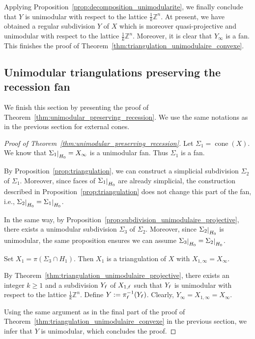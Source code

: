 \documentclass[11pt]{amsart}
\theoremstyle{definition}
\numberwithin{equation}{section}
\newcommand{\ie}{i.e.}
\renewcommand{\~}{\widetilde}
\newcommand{\Z}{\mathbb{Z}}
\newcommand{\rest}[1]{\raisebox{-1pt}{$\vert$}_{#1}}
\newcommand{\f}{{\textnormal{\textsl{\textsf f}}}} %
\DeclareMathOperator{\coneupop}{cone}
\newcommand{\coneup}[1]{\coneupop(#1)} %
\begin{document}
\medskip

Applying Proposition~\ref{prop:decomposition_unimodularite}, we finally conclude that $Y$ is unimodular with respect to the lattice $\frac 1k\Z^n$. At present, we have obtained a regular subdivision $Y$ of $X$ which is moreover quasi-projective and unimodular with respect to the lattice $\frac 1k \Z^n$. Moreover, it is clear that $Y_\infty$ is a fan. This finishes the proof of Theorem~\ref{thm:triangulation_unimodulaire_convexe}.

\medskip



\subsection{Unimodular triangulations preserving the recession fan}
We finish this section by presenting the proof of Theorem~\ref{thm:unimodular_preserving_recession}. We use the same notations as in the previous section for external cones.

\begin{proof}[Proof of Theorem~\ref{thm:unimodular_preserving_recession}]
Let $\Sigma_1=\coneup X$. We know that $\Sigma_1\rest{H_0}=X_\infty$ is a unimodular fan. Thus $\Sigma_1$ is a fan.

\medskip

By Proposition~\ref{prop:triangulation}, we can construct a simplicial subdivision $\Sigma_2$ of $\Sigma_1$. Moreover, since faces of $\Sigma_1\rest{H_0}$ are already simplicial, the construction described in Proposition~\ref{prop:triangulation} does not change this part of the fan, \ie, $\Sigma_2\rest{H_0}=\Sigma_1\rest {H_0}$.

\medskip

In the same way, by Proposition~\ref{prop:subdivision_unimodulaire_projective}, there exists a unimodular subdivision $\Sigma_3$ of $\Sigma_2$. Moreover, since $\Sigma_2\rest{H_0}$ is unimodular, the same proposition ensures we can assume $\Sigma_3\rest{H_0}=\Sigma_2\rest{H_0}$.

\medskip

Set $X_1=\pi(\Sigma_3\cap H_1)$. Then $X_1$ is a triangulation of $X$ with $X_{1,\infty}=X_\infty$.
\medskip

By Theorem~\ref{thm:triangulation_unimodulaire_projective}, there exists an integer $k\geq1$ and a subdivision $Y_\f$ of $X_{1,\f}$ such that $Y_\f$ is unimodular with respect to the lattice $\frac1k\Z^n$. Define $Y:=\pi_\f^{-1}(Y_\f)$. Clearly, $Y_\infty=X_{1,\infty}=X_\infty$.

\medskip

Using the same argument as in the final part of the proof of Theorem~\ref{thm:triangulation_unimodulaire_convexe} in the previous section, we infer that $Y$ is unimodular, which concludes the proof.
\end{proof}
\end{document}
